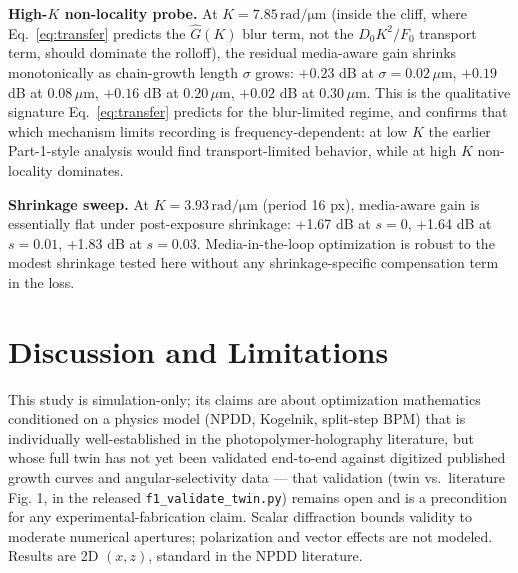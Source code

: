 \documentclass[conference]{IEEEtran}
\begin{document}
\textbf{High-$K$ non-locality probe.} At $K = 7.85\,\mathrm{rad/\mu m}$ (inside
the cliff, where Eq.~\ref{eq:transfer} predicts the $\hat G(K)$ blur term, not
the $D_0K^2/F_0$ transport term, should dominate the rolloff), the residual
media-aware gain shrinks monotonically as chain-growth length $\sigma$ grows:
$+0.23$ dB at $\sigma = 0.02\,\mu$m, $+0.19$ dB at $0.08\,\mu$m, $+0.16$ dB at
$0.20\,\mu$m, $+0.02$ dB at $0.30\,\mu$m. This is the qualitative signature
Eq.~\ref{eq:transfer} predicts for the blur-limited regime, and confirms that
which mechanism limits recording is frequency-dependent: at low $K$ the
earlier Part-1-style analysis would find transport-limited behavior, while at
high $K$ non-locality dominates.

\textbf{Shrinkage sweep.} At $K = 3.93\,\mathrm{rad/\mu m}$ (period 16 px),
media-aware gain is essentially flat under post-exposure shrinkage: +1.67 dB
at $s=0$, +1.64 dB at $s=0.01$, +1.83 dB at $s=0.03$. Media-in-the-loop
optimization is robust to the modest shrinkage tested here without any
shrinkage-specific compensation term in the loss.

\section{Discussion and Limitations}
\label{sec:limitations}
This study is simulation-only; its claims are about optimization mathematics
conditioned on a physics model (NPDD, Kogelnik, split-step BPM) that is
individually well-established in the photopolymer-holography literature, but
whose full twin has not yet been validated end-to-end against digitized
published growth curves and angular-selectivity data — that validation
(twin vs.\ literature Fig. 1, in the released \texttt{f1\_validate\_twin.py})
remains open and is a precondition for any experimental-fabrication claim.
Scalar diffraction bounds validity to moderate numerical apertures;
polarization and vector effects are not modeled. Results are 2D $(x,z)$,
standard in the NPDD literature.
\end{document}
